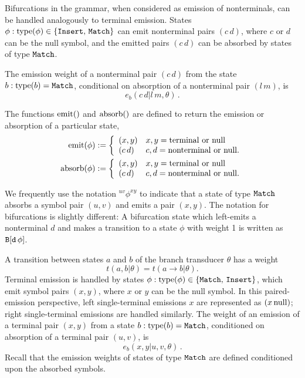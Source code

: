\documentclass[10pt]{article}
\begin{document}
Bifurcations in the grammar, when considered as emission of nonterminals, can be handled analogously
to terminal emission.  States $\phi: \operatorname{type}(\phi) \in \{\mathtt{Insert},\,\mathtt{Match}\}$ can emit nonterminal pairs $(c\,d)$,
where $c$ or $d$ can be the null symbol, and the emitted pairs $(c\,d)$ can be absorbed by states of type $\mathtt{Match}$.

The emission weight of a nonterminal pair $(c\,d)$ from the state $b: \operatorname{type}(b) = \mathtt{Match}$, 
conditional on absorption of a nonterminal pair $(l\,m)$, is 
\[ e_b ( c\,d|l\,m,\theta ) \, . \]

The functions $\operatorname{emit}()$ and $\operatorname{absorb}()$ are defined to return the emission or absorption of a particular state,
\begin{align*}
  \operatorname{emit}(\phi) &:= \left\{\begin{array}{ll} (x,y) & x,y = \mathrm{terminal\,\,or\,\,null} \\(c\,d) & c,d = \mathrm{nonterminal\,\,or\,\,null}. \end{array} \right. \\
  \operatorname{absorb}(\phi) &:= \left\{\begin{array}{ll} (x,y) & x,y = \mathrm{terminal\,\,or\,\,null} \\(c\,d) & c,d = \mathrm{nonterminal\,\,or\,\,null}. \end{array} \right.
\end{align*}

We frequently use the notation ${}^{uv}\phi^{xy}$ to indicate that a state of type $\mathtt{Match}$ absorbs a symbol pair $(u,v)$
and emits a pair $(x,y)$.
The notation for bifurcations is slightly different:
A bifurcation state which left-emits a nonterminal $d$ and makes a transition to a state $\phi$ with weight 1 is written as $\mathtt{B[d\,\phi]}$.

A transition between states $a$ and $b$ of the branch transducer $\theta$ has a weight
\[ t(a,b|\theta) = t(a \to b|\theta). \]
Terminal emission is handled by states $\phi: \operatorname{type}(\phi) \in \{\mathtt{Match},\,\mathtt{Insert}\}$, which emit symbol pairs $(x,y)$,
where $x$ or $y$ can be the null symbol.
In this paired-emission perspective, left single-terminal emissions $x$ are represented as $(x\,\mathrm{null})$;
right single-terminal emissions are handled similarly.
The weight of an emission of a terminal pair $(x,y)$ from a state $b: \operatorname{type}(b) = \mathtt{Match}$, 
conditioned on absorption of a terminal pair $(u,v)$, is 
\[ e_b ( x,y|u,v,\theta ) \, . \]
Recall that the emission weights of states of type $\mathtt{Match}$ are defined conditioned upon the absorbed symbols.
\end{document}
